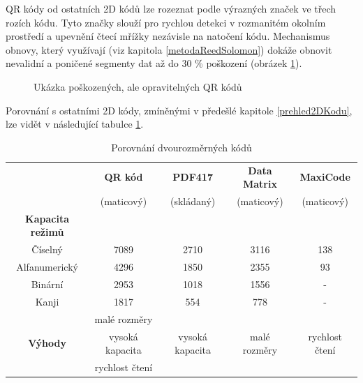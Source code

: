 QR kódy od ostatních 2D kódů lze rozeznat podle výrazných značek ve třech rozích 
kódu. Tyto značky slouží pro rychlou detekci v rozmanitém okolním prostředí a 
upevnění čtecí mřížky nezávisle na natočení kódu. Mechanismus obnovy, který 
využívají (viz kapitola \ref{metodaReedSolomon}) dokáže obnovit nevalidní a
poničené segmenty dat až do 30 \% poškození (obrázek \ref{corruptedQRCodes}).   

\begin{figure}[H]
  \begin{center}
    \caption{Ukázka poškozených, ale opravitelných QR kódů}
    \label{corruptedQRCodes}
  \end{center}
\end{figure}

Porovnání s ostatními 2D kódy, zmíněnými v předešlé kapitole
\ref{prehled2DKodu}, lze vidět v následující tabulce \ref{porovnani2DKodu}.

\begin{table}[H]
  \begin{center} 
    \begin{tabular}{| c | c | c | c | c |} \hline
     & \textbf{QR kód} & \textbf{PDF417} & \textbf{Data Matrix} &
     \textbf{MaxiCode} \\
     & (maticový) & (skládaný) & (maticový) & (maticový) \\ \hline
    \textbf{Kapacita režimů} & & & & \\ \hline
    Číselný& 7089 & 2710 & 3116 & 138 \\ \hline
    Alfanumerický & 4296 & 1850 & 2355 & 93 \\ \hline
    Binární & 2953 & 1018 & 1556 & - \\ \hline
    Kanji & 1817 & 554 & 778 & - \\ \hline
     & malé rozměry & \multirow{3}{*}{vysoká kapacita} & \multirow{3}{*}{malé 
     rozměry} & \multirow{3}{*}{rychlost čtení} \\
    \textbf{Výhody} & vysoká kapacita &  &  &  \\
     &rychlost čtení &  &  &  \\ \hline
    \end{tabular}
    \caption{Porovnání dvourozměrných kódů \cite{aboutQRCOde}}
    \label{porovnani2DKodu}
  \end{center}
\end{table}

